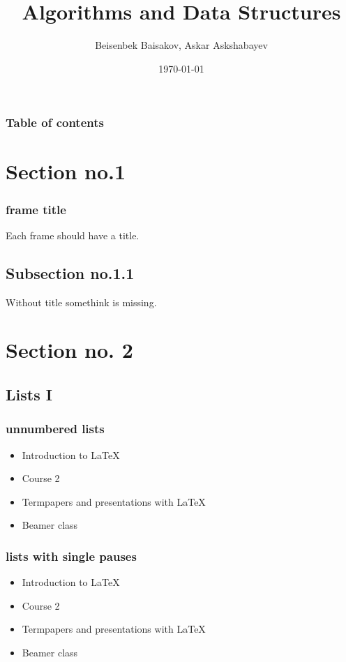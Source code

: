 \documentclass[hyperref={pdfpagelabels=false}]{beamer}
\title{Algorithms and Data Structures}
\author{Beisenbek Baisakov, Askar Askshabayev}
\date{\today}
\begin{document}
    \begin{frame}
    \titlepage
    \end{frame} 
    
    
    \begin{frame}
    \frametitle{Table of contents}
    \tableofcontents
    \end{frame} 
    
    
    \section{Section no.1} 
    \begin{frame}
    \frametitle{frame title} 
    Each frame should have a title.
    \end{frame}
    \subsection{Subsection no.1.1  }
    \begin{frame}
    Without title somethink is missing. 
    \end{frame}
    
    
    \section{Section no. 2} 
    \subsection{Lists I}
    \begin{frame}
    \frametitle{unnumbered lists}
    \begin{itemize}
    \item Introduction to  \LaTeX{}  
    \item Course 2 
    \item Termpapers and presentations with \LaTeX{}  
    \item Beamer class
    \end{itemize} 
    \end{frame}
    
    \begin{frame}\frametitle{lists with single pauses}
    \begin{itemize}
    \item Introduction to  \LaTeX{}  \pause 
    \item Course 2 \pause 
    \item Termpapers and presentations with \LaTeX{}  \pause 
    \item Beamer class
    \end{itemize} 
    \end{frame}
    
\end{document}
